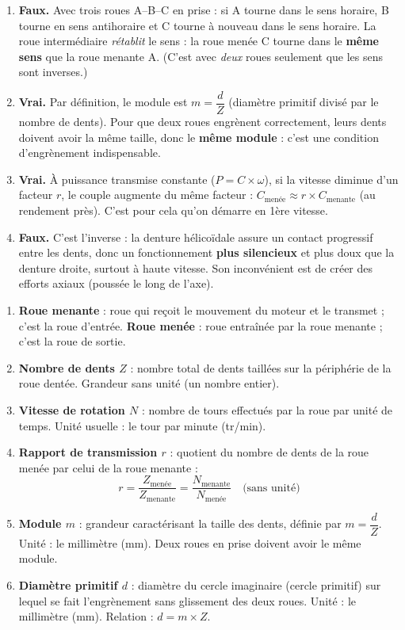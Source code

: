 \documentclass[11pt]{article}
\newcommand{\cle}[1]{{\popxbold\color{popdark}#1}}
\begin{document}
\begin{corrige}
\begin{enumerate}
    \item \textbf{Faux.} Avec trois roues A--B--C en prise : si A tourne dans le sens horaire, B tourne en sens antihoraire et C tourne à nouveau dans le sens horaire. La roue intermédiaire \emph{rétablit} le sens : la roue menée C tourne dans le \textbf{même sens} que la roue menante A. (C'est avec \emph{deux} roues seulement que les sens sont inverses.)
    \item \textbf{Vrai.} Par définition, le module est $m = \dfrac{d}{Z}$ (diamètre primitif divisé par le nombre de dents). Pour que deux roues engrènent correctement, leurs dents doivent avoir la même taille, donc le \textbf{même module} : c'est une condition d'engrènement indispensable.
    \item \textbf{Vrai.} À puissance transmise constante ($P = C \times \omega$), si la vitesse diminue d'un facteur $r$, le couple augmente du même facteur : $C_{\text{menée}} \approx r \times C_{\text{menante}}$ (au rendement près). C'est pour cela qu'on démarre en 1ère vitesse.
    \item \textbf{Faux.} C'est l'inverse : la denture \cle{hélicoïdale} assure un contact progressif entre les dents, donc un fonctionnement \textbf{plus silencieux} et plus doux que la denture droite, surtout à haute vitesse. Son inconvénient est de créer des efforts axiaux (poussée le long de l'axe).
\end{enumerate}
\end{corrige}

\begin{corrige}
\begin{enumerate}
    \item \textbf{Roue menante} : roue qui reçoit le mouvement du moteur et le transmet ; c'est la roue d'entrée. \textbf{Roue menée} : roue entraînée par la roue menante ; c'est la roue de sortie.
    \item \textbf{Nombre de dents $Z$} : nombre total de dents taillées sur la périphérie de la roue dentée. Grandeur sans unité (un nombre entier).
    \item \textbf{Vitesse de rotation $N$} : nombre de tours effectués par la roue par unité de temps. Unité usuelle : le tour par minute (tr/min).
    \item \textbf{Rapport de transmission $r$} : quotient du nombre de dents de la roue menée par celui de la roue menante :
    \[ r = \frac{Z_{\text{menée}}}{Z_{\text{menante}}} = \frac{N_{\text{menante}}}{N_{\text{menée}}} \quad \text{(sans unité)} \]
    \item \textbf{Module $m$} : grandeur caractérisant la taille des dents, définie par $m = \dfrac{d}{Z}$. Unité : le millimètre (mm). Deux roues en prise doivent avoir le même module.
    \item \textbf{Diamètre primitif $d$} : diamètre du cercle imaginaire (cercle primitif) sur lequel se fait l'engrènement sans glissement des deux roues. Unité : le millimètre (mm). Relation : $d = m \times Z$.
\end{enumerate}
\end{corrige}
\end{document}
